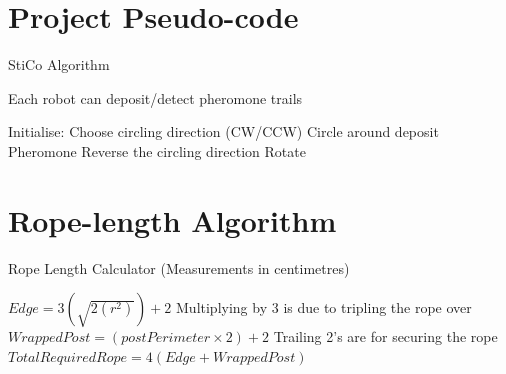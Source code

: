 \section{Project Pseudo-code}
\begin{algorithm}
  \caption{StiCo Algorithm\cite{Ranjbar-Sahraei2012Demo} }
  \label{desSysPseuStiCo}
  \begin{algorithmic}[1]
    \Require Each robot can deposit/detect pheromone trails \par
    \State Initialise: Choose circling direction (CW/CCW)
    \Loop
    \State Circle around
    \State deposit Pheromone
    \EndWhile
    \State Reverse the circling direction
    \Else
    \State Rotate
    \EndWhile
    \EndIf
    \EndLoop
  \end{algorithmic}
\end{algorithm}

\section{Rope-length Algorithm}
\begin{algorithm}
  \caption{Rope Length Calculator (Measurements in centimetres) }
  \label{desSysRope}
  \begin{algorithmic}[1]
    \State $ Edge = 3(\sqrt{2(r^{2} ) } ) + 2 $
    \Comment Multiplying by 3 is due to tripling the rope over
    \State $ WrappedPost = (postPerimeter \times 2) + 2 $
    \Comment Trailing 2's are for securing the rope
    \State $ TotalRequiredRope = 4(Edge + WrappedPost) $
  \end{algorithmic}
\end{algorithm}
\clearpage

